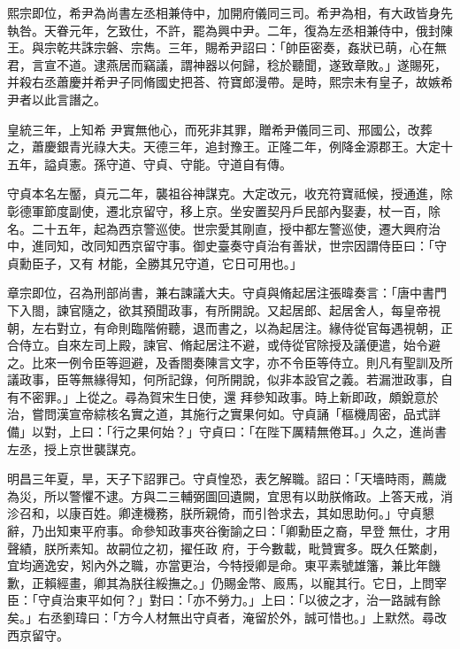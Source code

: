 \begin{pinyinscope}
 熙宗即位，希尹為尚書左丞相兼侍中，加開府儀同三司。希尹為相，有大政皆身先執咎。天眷元年，乞致仕，不許，罷為興中尹。二年，復為左丞相兼侍中，俄封陳王。與宗乾共誅宗磐、宗雋。三年，賜希尹詔曰：「帥臣密奏，姦狀已萌，心在無君，言宣不道。逮燕居而竊議，謂神器以何歸，稔於聽聞，遂致章敗。」遂賜死，并殺右丞蕭慶并希尹子同脩國史把荅、符寶郎漫帶。是時，熙宗未有皇子，故嫉希尹者以此言譖之。



 皇統三年，上知希
 尹實無他心，而死非其罪，贈希尹儀同三司、邢國公，改葬之，蕭慶銀青光祿大夫。天德三年，追封豫王。正隆二年，例降金源郡王。大定十五年，謚貞憲。孫守道、守貞、守能。守道自有傳。



 守貞本名左靨，貞元二年，襲祖谷神謀克。大定改元，收充符寶祗候，授通進，除彰德軍節度副使，遷北京留守，移上京。坐安置契丹戶民部內娶妻，杖一百，除名。二十五年，起為西京警巡使。世宗愛其剛直，授中都左警巡使，遷大興府治中，進同知，改同知西京留守事。御史臺奏守貞治有善狀，世宗因謂侍臣曰：「守貞勳臣子，又有
 材能，全勝其兄守道，它日可用也。」



 章宗即位，召為刑部尚書，兼右諫議大夫。守貞與脩起居注張暐奏言：「唐中書門下入閤，諫官隨之，欲其預聞政事，有所開說。又起居郎、起居舍人，每皇帝視朝，左右對立，有命則臨階俯聽，退而書之，以為起居注。緣侍從官每遇視朝，正合侍立。自來左司上殿，諫官、脩起居注不避，或侍從官除授及議便遣，始令避之。比來一例令臣等迴避，及香閤奏陳言文字，亦不令臣等侍立。則凡有聖訓及所議政事，臣等無緣得知，何所記錄，何所開說，似非本設官之義。若漏泄政事，自有不密罪。」上從之。尋為賀宋生日使，還
 拜參知政事。時上新即政，頗銳意於治，嘗問漢宣帝綜核名實之道，其施行之實果何如。守貞誦「樞機周密，品式詳備」以對，上曰：「行之果何始？」守貞曰：「在陛下厲精無倦耳。」久之，進尚書左丞，授上京世襲謀克。



 明昌三年夏，旱，天子下詔罪己。守貞惶恐，表乞解職。詔曰：「天墻時雨，薦歲為災，所以警懼不逮。方與二三輔弼圖回遺闕，宜思有以助朕脩政。上答天戒，消沴召和，以康百姓。卿達機務，朕所親倚，而引咎求去，其如思助何。」守貞懇辭，乃出知東平府事。命參知政事夾谷衡諭之曰：「卿勳臣之裔，早登無仕，才用聲績，朕所素知。故嗣位之初，擢任政
 府，于今數載，毗贊實多。既久任繁劇，宜均適逸安，矧內外之職，亦當更治，今特授卿是命。東平素號雄籓，兼比年饑歉，正賴經畫，卿其為朕往綏撫之。」仍賜金幣、廄馬，以寵其行。它日，上問宰臣：「守貞治東平如何？」對曰：「亦不勞力。」上曰：「以彼之才，治一路誠有餘矣。」右丞劉瑋曰：「方今人材無出守貞者，淹留於外，誠可惜也。」上默然。尋改西京留守。




\end{pinyinscope}
